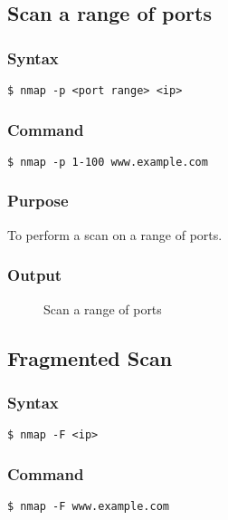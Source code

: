 \documentclass[11pt]{article}
\begin{document}
\subsection{Scan a range of ports}

\subsubsection{Syntax}
\begin{verbatim}
$ nmap -p <port range> <ip>
\end{verbatim}

\subsubsection*{Command}
\begin{verbatim}
$ nmap -p 1-100 www.example.com
\end{verbatim}

\subsubsection*{Purpose}
To perform a scan on a range of ports.

\subsubsection*{Output}
\begin{figure}[H]
    \centering
    \caption{Scan a range of ports}
    \label{fig:1}
\end{figure}

\subsection{Fragmented Scan}

\subsubsection{Syntax}
\begin{verbatim}
$ nmap -F <ip>
\end{verbatim}

\subsubsection*{Command}
\begin{verbatim}
$ nmap -F www.example.com
\end{verbatim}
\end{document}
